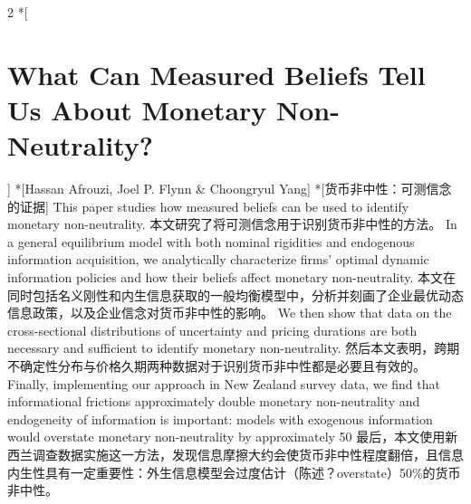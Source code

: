 \documentclass[cn,hazy,blue,14pt,screen]{elegantnote}
\begin{document}
\begin{paracol}{2}
	\switchcolumn[0]*[\section{What Can Measured Beliefs Tell Us About Monetary Non-Neutrality?}]
	\switchcolumn[0]*[Hassan Afrouzi, Joel P. Flynn \& Choongryul Yang]
	\switchcolumn[0]*[货币非中性：可测信念的证据]
	This paper studies how measured beliefs can be used to identify monetary non-neutrality. 
	\switchcolumn
	本文研究了将可测信念用于识别货币非中性的方法。
	\switchcolumn*
	In a general equilibrium model with both nominal rigidities and endogenous information acquisition, we analytically characterize firms’ optimal dynamic information policies and how their beliefs affect monetary non-neutrality.
	\switchcolumn
	本文在同时包括名义刚性和内生信息获取的一般均衡模型中，分析并刻画了企业最优动态信息政策，以及企业信念对货币非中性的影响。
	\switchcolumn*
	We then show that data on the cross-sectional distributions of uncertainty and pricing durations are both necessary and sufficient to identify monetary non-neutrality. 	
	\switchcolumn
	然后本文表明，跨期不确定性分布与价格久期两种数据对于识别货币非中性都是必要且有效的。
	\switchcolumn*
	Finally, implementing our approach in New Zealand survey data, we find that informational frictions approximately double monetary non-neutrality and endogeneity of information is important: models with exogenous information would overstate monetary non-neutrality by approximately 50%
	\switchcolumn
	最后，本文使用新西兰调查数据实施这一方法，发现信息摩擦大约会使货币非中性程度翻倍，且信息内生性具有一定重要性：外生信息模型会过度估计（陈述？overstate）50\%的货币非中性。
\end{paracol}
\end{document}
